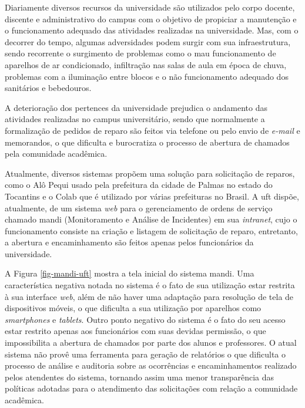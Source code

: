 Diariamente diversos recursos da universidade são utilizados pelo corpo docente, discente e administrativo do campus com o objetivo de propiciar a manutenção e o funcionamento adequado das atividades realizadas na universidade. Mas, com o decorrer do tempo, algumas adversidades podem surgir com sua infraestrutura, sendo recorrente o surgimento de problemas como o mau funcionamento de aparelhos de ar condicionado, infiltração nas salas de aula em época de chuva, problemas com a iluminação entre blocos e o não funcionamento adequado dos sanitários e bebedouros.

A deterioração dos pertences da universidade prejudica o andamento das atividades realizadas no campus universitário, sendo que normalmente a formalização de pedidos de reparo são feitos via telefone ou pelo envio de \textit{e-mail} e memorandos, o que dificulta e burocratiza o processo de abertura de chamados pela comunidade acadêmica.

Atualmente, diversos sistemas propõem uma solução para solicitação de reparos, como o Alô Pequi \cite{alo_pequi} usado pela prefeitura da cidade de Palmas no estado do Tocantins e o Colab \cite{colab} que é utilizado por várias prefeituras no Brasil. A \acrshort{uft} dispõe, atualmente, de  um sistema \textit{web} para o gerenciamento de ordens de serviço chamado \gls{mandi} (Monitoramento e Análise de Incidentes) em sua \textit{intranet}, cujo o funcionamento consiste na criação e listagem de solicitação de reparo, entretanto, a abertura e encaminhamento são feitos apenas pelos funcionários da universidade.

A Figura \ref{fig-mandi-uft} mostra a tela inicial do sistema  \acrshort{mandi}. Uma característica negativa notada no sistema é o fato de sua utilização estar restrita à sua interface \textit{web}, além de não haver uma adaptação para resolução de tela de dispositivos móveis, o que dificulta a sua utilização por aparelhos como \textit{smartphones} e \textit{tablets}. Outro ponto negativo do sistema é o fato do seu acesso estar restrito apenas aos funcionários com suas devidas permissão, o que impossibilita a abertura de chamados por parte dos alunos e professores. O atual sistema não provê uma ferramenta para geração de relatórios o que dificulta o processo de análise e auditoria sobre as ocorrências e encaminhamentos realizado pelos atendentes do sistema, tornando assim uma menor transparência das políticas adotadas para o atendimento das solicitações com relação a comunidade acadêmica.


